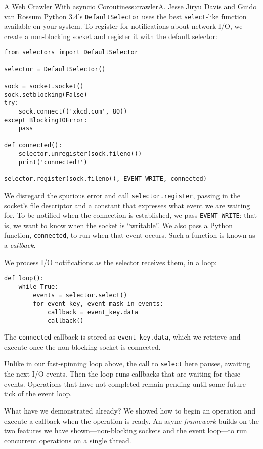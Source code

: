 \begin{aosachapter}{A Web Crawler With asyncio Coroutines}{s:crawler}{A. Jesse Jiryu Davis and Guido van Rossum}
Python 3.4's \texttt{DefaultSelector} uses the best \texttt{select}-like
function available on your system. To register for notifications about
network I/O, we create a non-blocking socket and register it with the
default selector:

\begin{verbatim}
from selectors import DefaultSelector

selector = DefaultSelector()

sock = socket.socket()
sock.setblocking(False)
try:
    sock.connect(('xkcd.com', 80))
except BlockingIOError:
    pass

def connected():
    selector.unregister(sock.fileno())
    print('connected!')

selector.register(sock.fileno(), EVENT_WRITE, connected)
\end{verbatim}

We disregard the spurious error and call \texttt{selector.register},
passing in the socket's file descriptor and a constant that expresses
what event we are waiting for. To be notified when the connection is
established, we pass \texttt{EVENT\_WRITE}: that is, we want to know
when the socket is ``writable''. We also pass a Python function,
\texttt{connected}, to run when that event occurs. Such a function is
known as a \emph{callback}.

We process I/O notifications as the selector receives them, in a loop:

\begin{verbatim}
def loop():
    while True:
        events = selector.select()
        for event_key, event_mask in events:
            callback = event_key.data
            callback()
\end{verbatim}

The \texttt{connected} callback is stored as \texttt{event\_key.data},
which we retrieve and execute once the non-blocking socket is connected.

Unlike in our fast-spinning loop above, the call to \texttt{select} here
pauses, awaiting the next I/O events. Then the loop runs callbacks that
are waiting for these events. Operations that have not completed remain
pending until some future tick of the event loop.

What have we demonstrated already? We showed how to begin an operation
and execute a callback when the operation is ready. An async
\emph{framework} builds on the two features we have shown---non-blocking
sockets and the event loop---to run concurrent operations on a single
thread.


\end{aosachapter}
